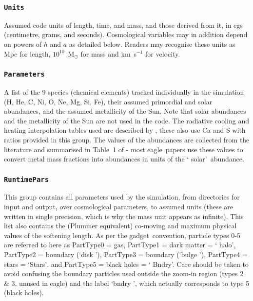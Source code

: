 \documentclass[10pt, a4paper]{article}
\newcommand{\eagle}{{\sc eagle}}
\newcommand{\gadget}{{\sc gadget}}
\begin{document}
\subsubsection{\texttt{Units}}
Assumed code units of length, time, and mass, and those derived from it, in cgs
(centimetre, grams, and seconds). Cosmological variables may in addition
depend on powers of $h$ and $a$ as detailed below. Readers may recognise these
units as Mpc for length, $10^{10}$~M$_\odot$ for mass and km~s$^{-1}$ for
velocity.

\subsubsection{\texttt{Parameters}} A list of the 9 species (chemical elements)
tracked individually in the simulation (H, He, C, Ni, O, Ne, Mg, Si, Fe), their
assumed primordial and solar abundances, and the assumed metallicity of the
Sun. Note that solar abundances and the metallicity of the Sun are not used in
the code. The radiative cooling and heating interpolation tables used are
described by \cite{2009MNRAS.393...99W}, these also use Ca and S with ratios provided in
this group. The values of the abundances are collected from the literature and
summarised in Table~1 of \cite{2009MNRAS.393...99W} - most \eagle\ papers use these
values to convert metal mass fractions into abundances in units of the \lq
solar\rq\ abundance.

\subsubsection{\texttt{RuntimePars}}
This group contains all parameters used by the simulation, from directories for
input and output, over cosmological parameters, to assumed units (these are
written in single precision, which is why the mass unit appears as infinite).
This list also contains the (Plummer equivalent) co-moving and maximum physical
values of the softening length. As per the \gadget\ convention, particle types
0-5 are referred to here as PartType0 = gas, PartType1 = dark matter = \lq
halo\rq, PartType2 = boundary (\lq disk \rq), PartType3 = boundary (\lq bulge \rq), PartType4 = stars = \lq Stars\rq, and PartType5 = black holes = \lq
Bndry\rq. Care should be taken to avoid confusing the boundary particles used
outside the zoom-in region (types 2 \& 3, unused in \eagle) and the label \lq bndry \rq,
which actually corresponds to type 5 (black holes).
\end{document}
